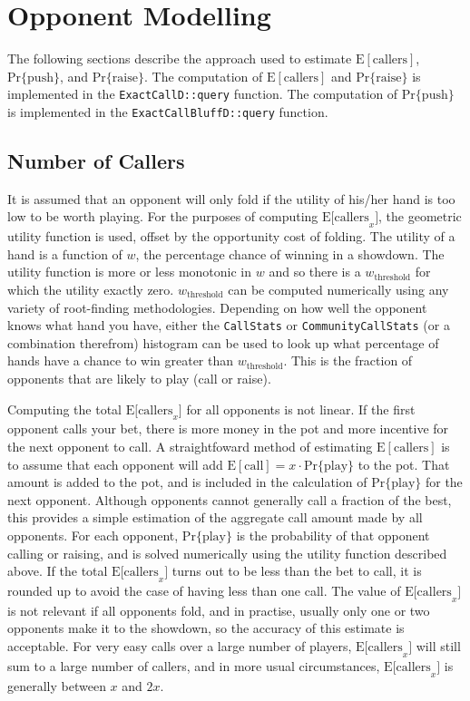 \section{Opponent Modelling}

The following sections describe the approach used to estimate $\mathrm{E[callers]}$, $\mathrm{Pr\{push\}}$, and $\mathrm{Pr\{raise\}}$.
The computation of $\mathrm{E[callers]}$ and $\mathrm{Pr\{raise\}}$ is implemented in the \texttt{ExactCallD::query} function.
The computation of $\mathrm{Pr\{push\}}$ is implemented in the \texttt{ExactCallBluffD::query} function.

\subsection{Number of Callers}
\label{sec:Callers}
It is assumed that an opponent will only fold if the utility of his/her hand is too low to be worth playing.
For the purposes of computing $\mathrm{E[callers}_x]$, the geometric utility function is used, offset by the opportunity cost of folding.
The utility of a hand is a function of $w$, the percentage chance of winning in a showdown.
The utility function is more or less monotonic in $w$ and so there is a $w_\mathrm{threshold}$ for which the utility exactly zero.
$w_\mathrm{threshold}$ can be computed numerically using any variety of root-finding methodologies.
Depending on how well the opponent knows what hand you have, either the \texttt{CallStats} or \texttt{CommunityCallStats} (or a combination therefrom) histogram can be used to look up what percentage of hands have a chance to win greater than $w_\mathrm{threshold}$.
This is the fraction of opponents that are likely to play (call or raise).


Computing the total $\mathrm{E[callers}_x]$ for all opponents is not linear.
If the first opponent calls your bet, there is more money in the pot and more incentive for the next opponent to call.
A straightfoward method of estimating $\mathrm{E[callers]}$ is to assume that each opponent will add $\mathrm{E[call]} = x \cdot \mathrm{Pr\{play\}}$ to the pot.
That amount is added to the pot, and is included in the calculation of $\mathrm{Pr\{play\}}$ for the next opponent.
Although opponents cannot generally call a fraction of the best, this provides a simple estimation of the aggregate call amount made by all opponents.
For each opponent, $\mathrm{Pr\{play\}}$ is the probability of that opponent calling or raising, and is solved numerically using the utility function described above.
If the total $\mathrm{E[callers}_x]$ turns out to be less than the bet to call, it is rounded up to avoid the case of having less than one call.
The value of $\mathrm{E[callers}_x]$ is not relevant if all opponents fold, and in practise, usually only one or two opponents make it to the showdown, so the accuracy of this estimate is acceptable.
For very easy calls over a large number of players, $\mathrm{E[callers}_x]$ will still sum to a large number of callers, and in more usual circumstances, $\mathrm{E[callers}_x]$ is generally between $x$ and $2x$.


